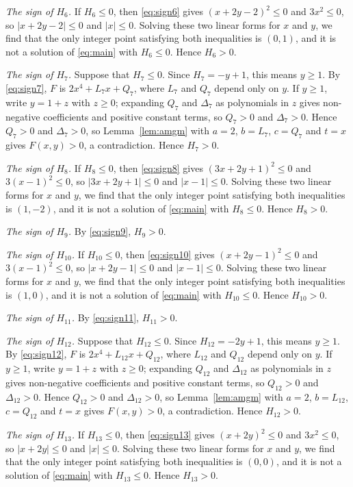 \documentclass[11pt]{article}
\begin{document}
\emph{The sign of $H_{6}$.} If $H_{6}\leq0$, then \eqref{eq:sign6} gives $(x+2y-2)^2\leq 0$ and $3x^2\leq 0$, so $|x+2y-2|\leq0$ and $|x|\leq0$. Solving these two linear forms for $x$ and $y$, we find that the only integer point satisfying both inequalities is $(0,1)$, and it is not a solution of \eqref{eq:main} with $H_{6}\leq0$. Hence $H_{6}>0$.

\emph{The sign of $H_{7}$.} Suppose that $H_{7}\leq0$. Since $H_{7}=-y+1$, this means $y\geq1$. By \eqref{eq:sign7}, $F$ is $2x^4+L_{7}x+Q_{7}$, where $L_{7}$ and $Q_{7}$ depend only on $y$. If $y\geq1$, write $y=1+z$ with $z\geq0$; expanding $Q_{7}$ and $\Delta_{7}$ as polynomials in $z$ gives non-negative coefficients and positive constant terms, so $Q_{7}>0$ and $\Delta_{7}>0$. Hence $Q_{7}>0$ and $\Delta_{7}>0$, so Lemma~\ref{lem:amgm} with $a=2$, $b=L_{7}$, $c=Q_{7}$ and $t=x$ gives $F(x,y)>0$, a contradiction. Hence $H_{7}>0$.

\emph{The sign of $H_{8}$.} If $H_{8}\leq0$, then \eqref{eq:sign8} gives $(3x+2y+1)^2\leq 0$ and $3(x-1)^2\leq 0$, so $|3x+2y+1|\leq0$ and $|x-1|\leq0$. Solving these two linear forms for $x$ and $y$, we find that the only integer point satisfying both inequalities is $(1,-2)$, and it is not a solution of \eqref{eq:main} with $H_{8}\leq0$. Hence $H_{8}>0$.

\emph{The sign of $H_{9}$.} By \eqref{eq:sign9}, $H_{9}>0$.

\emph{The sign of $H_{10}$.} If $H_{10}\leq0$, then \eqref{eq:sign10} gives $(x+2y-1)^2\leq 0$ and $3(x-1)^2\leq 0$, so $|x+2y-1|\leq0$ and $|x-1|\leq0$. Solving these two linear forms for $x$ and $y$, we find that the only integer point satisfying both inequalities is $(1,0)$, and it is not a solution of \eqref{eq:main} with $H_{10}\leq0$. Hence $H_{10}>0$.

\emph{The sign of $H_{11}$.} By \eqref{eq:sign11}, $H_{11}>0$.

\emph{The sign of $H_{12}$.} Suppose that $H_{12}\leq0$. Since $H_{12}=-2y+1$, this means $y\geq1$. By \eqref{eq:sign12}, $F$ is $2x^4+L_{12}x+Q_{12}$, where $L_{12}$ and $Q_{12}$ depend only on $y$. If $y\geq1$, write $y=1+z$ with $z\geq0$; expanding $Q_{12}$ and $\Delta_{12}$ as polynomials in $z$ gives non-negative coefficients and positive constant terms, so $Q_{12}>0$ and $\Delta_{12}>0$. Hence $Q_{12}>0$ and $\Delta_{12}>0$, so Lemma~\ref{lem:amgm} with $a=2$, $b=L_{12}$, $c=Q_{12}$ and $t=x$ gives $F(x,y)>0$, a contradiction. Hence $H_{12}>0$.

\emph{The sign of $H_{13}$.} If $H_{13}\leq0$, then \eqref{eq:sign13} gives $(x+2y)^2\leq 0$ and $3x^2\leq 0$, so $|x+2y|\leq0$ and $|x|\leq0$. Solving these two linear forms for $x$ and $y$, we find that the only integer point satisfying both inequalities is $(0,0)$, and it is not a solution of \eqref{eq:main} with $H_{13}\leq0$. Hence $H_{13}>0$.
\end{document}
